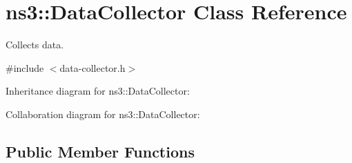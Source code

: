 \hypertarget{classns3_1_1DataCollector}{}\section{ns3\+:\+:Data\+Collector Class Reference}
\label{classns3_1_1DataCollector}


Collects data.  




{\ttfamily \#include $<$data-\/collector.\+h$>$}



Inheritance diagram for ns3\+:\+:Data\+Collector\+:


Collaboration diagram for ns3\+:\+:Data\+Collector\+:
\subsection*{Public Member Functions}
